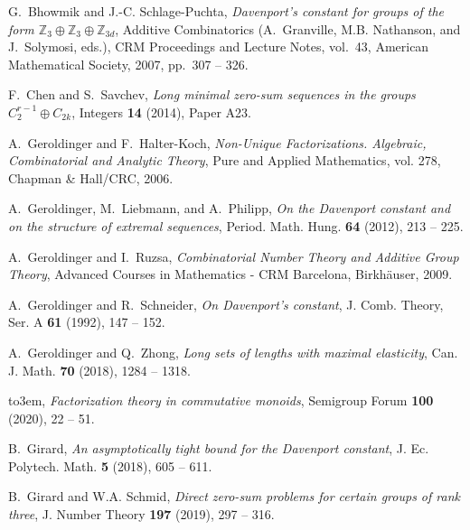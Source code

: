 \documentclass[a4paper,10pt]{amsart}
\theoremstyle{plain}
\theoremstyle{definition}
\numberwithin{equation}{section}
\begin{document}
\providecommand{\bysame}{\leavevmode\hbox to3em{\hrulefill}\thinspace}
\providecommand{\MR}{\relax\ifhmode\unskip\space\fi MR }
\providecommand{\MRhref}[2]{%
  \href{http://www.ams.org/mathscinet-getitem?mr=#1}{#2}
}
\providecommand{\href}[2]{#2}
\begin{thebibliography}{10}

G.~Bhowmik and J.-C. Schlage-Puchta, \emph{Davenport's constant for groups of
  the form $\mathbb{Z}_3 \oplus \mathbb{Z}_3 \oplus \mathbb{Z}_{3d}$}, Additive
  Combinatorics (A.~Granville, M.B. Nathanson, and J.~Solymosi, eds.), CRM
  Proceedings and Lecture Notes, vol.~43, American {M}athematical {S}ociety,
  2007, pp.~307 -- 326.

F.~Chen and S.~Savchev, \emph{Long minimal zero-sum sequences in the groups
  ${C}_2^{r-1} \oplus {C}_{2k}$}, Integers \textbf{14} (2014), Paper A23.

A.~Geroldinger and F.~Halter-Koch, \emph{Non-{U}nique {F}actorizations.
  {A}lgebraic, {C}ombinatorial and {A}nalytic {T}heory}, Pure and Applied
  Mathematics, vol. 278, Chapman \& Hall/CRC, 2006.

A.~Geroldinger, M.~Liebmann, and A.~Philipp, \emph{On the {D}avenport constant
  and on the structure of extremal sequences}, Period. Math. Hung. \textbf{64}
  (2012), 213 -- 225.

A.~Geroldinger and I.~Ruzsa, \emph{Combinatorial {N}umber {T}heory and
  {A}dditive {G}roup {T}heory}, Advanced Courses in Mathematics - CRM
  Barcelona, Birkh{\"a}user, 2009.

A.~Geroldinger and R.~Schneider, \emph{On {D}avenport's constant}, J. Comb.
  Theory, Ser. A \textbf{61} (1992), 147 -- 152.

A.~Geroldinger and Q.~Zhong, \emph{Long sets of lengths with maximal
  elasticity}, Can. J. Math. \textbf{70} (2018), 1284 -- 1318.

\bysame, \emph{Factorization theory in commutative monoids}, Semigroup Forum
  \textbf{100} (2020), 22 -- 51.

B.~Girard, \emph{An asymptotically tight bound for the {D}avenport constant},
  J. {Ec.} {P}olytech. Math. \textbf{5} (2018), 605 -- 611.

B.~Girard and W.A. Schmid, \emph{Direct zero-sum problems for certain groups of
  rank three}, J. Number Theory \textbf{197} (2019), 297 -- 316.


\end{thebibliography}
\end{document}
